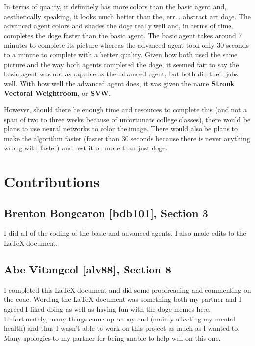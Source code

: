 \documentclass[11pt]{article}
\begin{document}
In terms of quality, it definitely has more colors than the basic agent and, aesthetically speaking, it looks much better than the, err... abstract art doge. The advanced agent colors and shades the doge really well and, in terms of time, completes the doge faster than the basic agent. The basic agent takes around 7 minutes to complete its picture whereas the advanced agent took only 30 seconds to a minute to complete with a better quality. Given how both used the same picture and the way both agents completed the doge, it seemed fair to say the basic agent was not as capable as the advanced agent, but both did their jobs well. With how well the advanced agent does, it was given the name \textbf{Stronk Vectoral Weightroom}, or \textbf{SVW}.

However, should there be enough time and resources to complete this (and not a span of two to three weeks because of unfortunate college classes), there would be plans to use neural networks to color the image. There would also be plans to make the algorithm faster (faster than 30 seconds because there is never anything wrong with faster) and test it on more than just doge.

\section{Contributions}
\subsection*{Brenton Bongcaron [bdb101], Section 3}
I did all of the coding of the basic and advanced agents. I also made edits to the \LaTeX\: document.
\subsection*{Abe Vitangcol [alv88], Section 8}
I completed this \LaTeX\: document and did some proofreading and commenting on the code. Wording the \LaTeX\: document was something both my partner and I agreed I liked doing as well as having fun with the doge memes here. Unfortunately, many things came up on my end (mainly affecting my mental health) and thus I wasn't able to work on this project as much as I wanted to. Many apologies to my partner for being unable to help well on this one.
\end{document}
